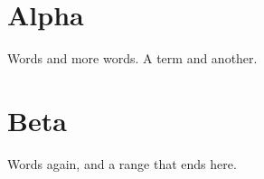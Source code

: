 \documentclass{article}
\begin{document}
\section{Alpha}
Words and more words. A
term and another.

\newpage
\section{Beta}
Words again, and a range that
ends here.
\printindex
\end{document}
